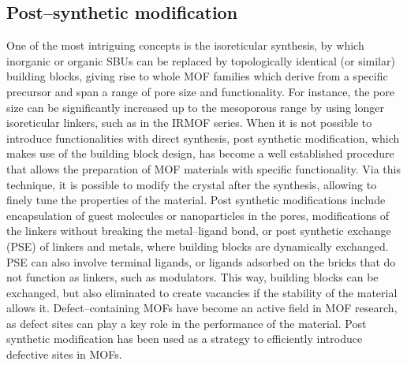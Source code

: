 \subsection*{Post--synthetic modification}
One of the most intriguing concepts is the isoreticular synthesis, by which inorganic or organic SBUs can be replaced by topologically identical (or similar) building blocks, giving rise to whole MOF families which derive from a specific precursor and span a range of pore size and functionality. For instance, the pore size can be significantly increased up to the mesoporous range by using longer isoreticular linkers, such as in the IRMOF series\cite{eddaoudi2002systematic}. When it is not possible to introduce functionalities with direct synthesis, post synthetic modification\cite{wang2009postsynthetic}, which makes use of the building block design, has become a well established procedure that allows the preparation of MOF materials with specific functionality. Via this technique, it is possible to modify the crystal after the synthesis, allowing to finely tune the properties of the material. Post synthetic modifications include encapsulation of guest molecules or nanoparticles in the pores, modifications of the linkers without breaking the metal--ligand bond, or post synthetic exchange (PSE) of linkers and metals, where building blocks are dynamically exchanged. 
PSE can also involve terminal ligands, or ligands adsorbed on the bricks that do not function as linkers, such as modulators. This way, building blocks can be exchanged, but also eliminated to create vacancies if the stability of the material allows it. Defect--containing MOFs have become an active field in MOF research, as defect sites can play a key role in the performance of the material. Post synthetic modification has been used as a strategy to efficiently introduce defective sites in MOFs. 


